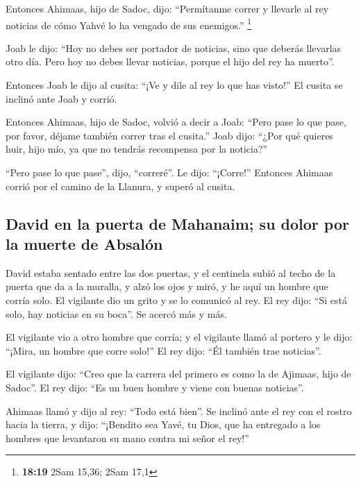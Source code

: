  Entonces Ahimaas, hijo de Sadoc, dijo: ``Permítanme
correr y llevarle al rey noticias de cómo Yahvé lo ha vengado de sus
enemigos.'' \footnote{\textbf{18:19} 2Sam 15,36; 2Sam 17,1}

 Joab le dijo: ``Hoy no debes ser portador de noticias,
sino que deberás llevarlas otro día. Pero hoy no debes llevar noticias,
porque el hijo del rey ha muerto''.

 Entonces Joab le dijo al cusita: ``¡Ve y dile al rey lo
que has visto!'' El cusita se inclinó ante Joab y corrió.

 Entonces Ahimaas, hijo de Sadoc, volvió a decir a Joab:
``Pero pase lo que pase, por favor, déjame también correr tras el
cusita.'' Joab dijo: ``¿Por qué quieres huir, hijo mío, ya que no
tendrás recompensa por la noticia?''

 ``Pero pase lo que pase'', dijo, ``correré''. Le dijo:
``¡Corre!'' Entonces Ahimaas corrió por el camino de la Llanura, y
superó al cusita.

\hypertarget{david-en-la-puerta-de-mahanaim-su-dolor-por-la-muerte-de-absaluxf3n}{%
\subsection{David en la puerta de Mahanaim; su dolor por la muerte de
Absalón}\label{david-en-la-puerta-de-mahanaim-su-dolor-por-la-muerte-de-absaluxf3n}}

 David estaba sentado entre las dos puertas, y el
centinela subió al techo de la puerta que da a la muralla, y alzó los
ojos y miró, y he aquí un hombre que corría solo.  El
vigilante dio un grito y se lo comunicó al rey. El rey dijo: ``Si está
solo, hay noticias en su boca''. Se acercó más y más.

 El vigilante vio a otro hombre que corría; y el
vigilante llamó al portero y le dijo: ``¡Mira, un hombre que corre
solo!'' El rey dijo: ``Él también trae noticias''.

 El vigilante dijo: ``Creo que la carrera del primero es
como la de Ajimaas, hijo de Sadoc''. El rey dijo: ``Es un buen hombre y
viene con buenas noticias''.

 Ahimaas llamó y dijo al rey: ``Todo está bien''. Se
inclinó ante el rey con el rostro hacia la tierra, y dijo: ``¡Bendito
sea Yavé, tu Dios, que ha entregado a los hombres que levantaron su mano
contra mi señor el rey!''

